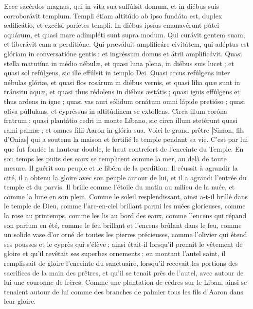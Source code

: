 \begin{paracol}{2}
Ecce sacérdos magnus, qui in vita  sua suffúlsit domum, et in diébus suis corroborávit templum. Templi étiam altitúdo ab ipso fundáta est, duplex ædificátio, et excélsi paríetes templi. In diébus ipsíus emanavérunt pútei aquárum, et quasi mare adimpléti sunt supra modum. Qui curávit gentem suam, et liberávit eam a perditióne. Qui præváluit amplificáre civitátem, qui adéptus est glóriam in conversatióne gentis : et ingréssum domus et átrii amplificávit. Quasi stella matutína in médio nébulæ, et quasi luna plena, in diébus suis lucet ; et quasi sol refúlgens, sic ille effúlsit in templo Dei. Quasi arcus refúlgens inter nébulas glóriæ, et quasi flos rosárum in diébus vernis, et quasi lília quæ sunt in tránsitu aquæ, et quasi thus rédolens in diébus æstátis ; quasi ignis effúlgens et thus ardens in igne ; quasi vas auri sólidum ornátum omni lápide pretióso ; quasi olíva púllulans, et cypréssus in altitúdinem se extóllens. Circa illum coróna fratrum : quasi plantátio cedri in monte Líbano, sic circa illum stetérunt quasi rami palmæ ; et omnes fílii Aaron in glória sua.
\switchcolumn
Voici le grand prêtre [Simon, fils d’Onias] qui a soutenu la maison et fortifié le temple pendant sa vie. C’est par lui que fut fondée la hauteur double, le haut contrefort de l’enceinte du Temple. En son temps  les puits des eaux se remplirent comme la mer, au delà de toute mesure. Il guérit son peuple et le libéra de la perdition. Il réussit à agrandir la cité, il a obtenu la gloire avec son peuple autour de lui, et il a agrandi l’entrée du temple et du parvis. Il brille comme l’étoile du matin au milieu de la nuée, et comme la lune en son plein. Comme le soleil resplendissant, ainsi a-t-il brillé dans le temple de Dieu, comme l’arc-en-ciel brillant parmi les nuées glorieuses, comme la rose au printemps, comme les lis au bord des eaux, comme l’encens qui répand son parfum en été, comme le feu brillant et l’encens brûlant dans le feu, comme un solide vase d’or orné de toutes les pierres précieuses, comme l’olivier qui étend ses pousses et le cyprès qui s’élève ; ainsi était-il lorsqu’il prenait le vêtement de gloire et qu’il revêtait ses superbes ornements ; en montant l’autel saint, il remplissait de gloire l’enceinte du sanctuaire, lorsqu’il recevait les portions des sacrifices de la main des prêtres, et qu’il se tenait près de l’autel, avec autour de lui une couronne de frères. Comme une plantation de cèdres sur le Liban, ainsi se tenaient autour de lui comme des branches de palmier tous les fils d’Aaron dans leur gloire.
\switchcolumn*


\end{paracol}
